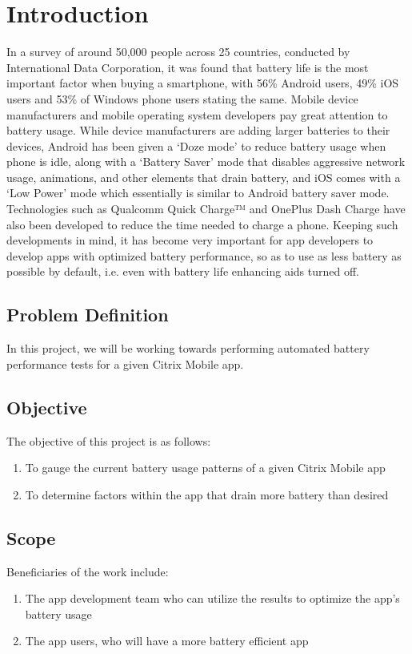\chapter{Introduction}

In a survey of around 50,000 people across 25 countries, conducted by International Data Corporation, it was found that battery life is the most important factor when buying a smartphone, with 56\% Android users, 49\% iOS users and 53\% of Windows phone users stating the same.\cite{idcsurvey} Mobile device manufacturers and mobile operating system developers pay great attention to battery usage. While device manufacturers are adding larger batteries to their devices, Android has been given a ‘Doze mode’ to reduce battery usage when phone is idle, along with a ‘Battery Saver’ mode that disables aggressive network usage, animations, and other elements that drain battery, and iOS comes with a ‘Low Power’ mode which essentially is similar to Android battery saver mode. Technologies such as Qualcomm Quick Charge™ and OnePlus Dash Charge have also been developed to reduce the time needed to charge a phone. Keeping such developments in mind, it has become very important for app developers to develop apps with optimized battery performance, so as to use as less battery as possible by default, i.e. even with battery life enhancing aids turned off.
\section{Problem Definition}	
In this project, we will be working towards performing automated battery performance tests for a given Citrix Mobile app.
\section{Objective}
The objective of this project is as follows:
\begin{enumerate}
	\item To gauge the current battery usage patterns of a given Citrix Mobile app
	\item To determine factors within the app that drain more battery than desired
\end{enumerate}

\section{Scope}
Beneficiaries of the work include:
\begin{enumerate}
	\item The app development team who can utilize the results to optimize the app’s battery usage
	\item The app users, who will have a more battery efficient app
\end{enumerate}
